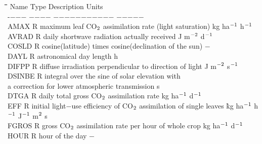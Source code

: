 \documentclass[11pt]{article}
\begin{document}
\begin{tabbing}
\hspace{1.27cm}\=\hspace{1.27cm}\=\hspace{1.27cm}\=\hspace{1.27cm}\=%
\hspace{1.27cm}\=\hspace{1.27cm}\=\hspace{1.27cm}\=\hspace{1.27cm}\=%
\hspace{1.27cm}\=\hspace{1.27cm}\=\kill
Name    \> \> Type   \> Description                                        \> \> \> \> \> \> \> Units\\
-$-$$-$$-$    \> \> $-$$-$$-$$-$   \> $-$$-$$-$$-$$-$$-$$-$$-$$-$$-$$-$                                        \> \> \> \> \> \> \> $-$$-$$-$$-$$-$\\
AMAX    \> \> R   \> maximum leaf CO$_{{\rm 2}}$ assimilation rate (light saturation)\> \> \> \> \> \> \> kg ha$^{{\rm -1}}$ h$^{{\rm -1}}$\\
AVRAD   \> \> R   \> daily shortwave radiation actually received  \> \> \> \> \> \> \> J m$^{{\rm -2}}$ d$^{{\rm -1}}$\\
COSLD   \> \> R   \> cosine(latitude) times cosine(declination of the sun)           \> \> \> \> \> \> \> $-$\\
DAYL    \> \> R   \> astronomical day length\> \> \>  \> \> \> \> h\\
DIFPP\> \> R\> diffuse irradiation perpendicular to direction of light\> \> \> \> \> \> \> J m$^{{\rm -2}}$ s$^{{\rm -1}}$\\
DSINBE\> \> R\> integral over the sine of solar elevation with\\
\>\> \> a correction for lower atmospheric transmission\> \> \> \> \> \> \> s\\
DTGA    \> \> R   \> daily total gross CO$_{{\rm 2}}$  assimilation rate       \> \> \> \> \> \> \> kg ha$^{{\rm -1}}$ d$^{{\rm -1}}$ \\
EFF     \> \> R   \> initial light$-$use efficiency of CO$_{{\rm 2}}$ assimilation of single leaves \`kg ha$^{{\rm -1}}$ h$^{{\rm -1}}$ J$^{{\rm -1}}$ m$^{{\rm 2}}$ s\\
FGROS   \> \> R   \> gross CO$_{{\rm 2}}$ assimilation rate per hour of whole crop        \> \> \> \> \> \> \> kg ha$^{{\rm -1}}$ d$^{{\rm -1}}$ \\
HOUR    \> \> R   \> hour of the day                                    \> \> \> \> \> \> \> $-$\\
$$
\end{tabbing}
\end{document}
